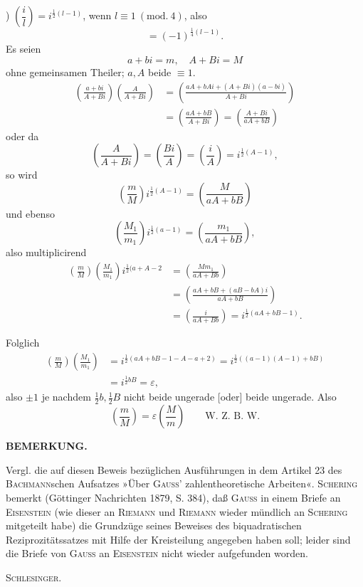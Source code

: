 \par{}) $\left(\dfrac il\right)=i^{\frac12(l-1)}$, wenn $l\equiv1\ (\mathrm{mod.}\ 4)$, also
\[
{}=(-1)^{\frac14(l-1)}.
\]
\noindent Es seien
\[
a+bi=m,\quad A+Bi=M
\]
\noindent ohne gemeinsamen Theiler; $a,A$ beide $\equiv1$.
\[
\begin{aligned}
\left(\frac{a+bi}{A+Bi}\right)\left(\frac A{A+Bi}\right)&=\left(\frac{aA+bAi+(A+Bi)(a-bi)}{A+Bi}\right)\\
&=\left(\frac{aA+bB}{A+Bi}\right)=\left(\frac{A+Bi}{aA+bB}\right)
\end{aligned}
\]
\noindent oder da
\[
\left(\frac A{A+Bi}\right)=\left(\frac{Bi}A\right)=\left(\frac iA\right)=i^{\frac12(A-1)},
\]
\noindent so wird
\[
\left(\frac mM\right)i^{\frac12(A-1)}=\left(\frac M{aA+bB}\right)
\]
\noindent und ebenso
\[
\left(\frac{M_1}{m_1}\right)i^{\frac12(a-1)}=\left(\frac{m_1}{aA+bB}\right),
\]
\noindent also multiplicirend
\[
\begin{aligned}
\left(\frac mM\right)\left(\frac{M_1}{m_1}\right)i^{\frac12(a+A-2}&=\left(\frac{Mm_1}{aA+Bb}\right)\\
&=\left(\frac{aA+bB+(aB-bA)i}{aA+bB}\right)\\
&=\left(\frac i{aA+Bb}\right)=i^{\frac12(aA+bB-1)}.
\end{aligned}
\]
\par\noindent\hspace*{\parindent}Folglich
\[
\begin{aligned}
\left(\frac mM\right)\left(\frac{M_1}{m_1}\right)&=i^{\frac12(aA+bB-1-A-a+2)}=i^{\frac12((a-1)(A-1)+bB)}\\
&=i^{\frac12bB}=\varepsilon,
\end{aligned}
\]
\noindent also $\pm1$ je nachdem $\tfrac12b,\tfrac12B$ nicht beide ungerade [oder] beide ungerade. Also
\[
\left(\frac mM\right)=\varepsilon\left(\frac Mm\right)\qquad\text{W. Z. B. W.}
\]
\begin{center}\textbf{BEMERKUNG.}\end{center}
\begingroup\small
\par\indent Vergl. die auf diesen Beweis bezüglichen Ausführungen in dem Artikel 23 des \textsc{Bachmann}schen Aufsatzes »Über \textsc{Gauss}' zahlentheoretische Arbeiten«. \textsc{Schering} bemerkt (Göttinger Nachrichten 1879, S. 384), daß \textsc{Gauss} in einem Briefe an \textsc{Eisenstein} (wie dieser an \textsc{Riemann} und \textsc{Riemann} wieder mündlich an \textsc{Schering} mitgeteilt habe) die Grundzüge seines Beweises des biquadratischen Reziprozitätssatzes mit Hilfe der Kreisteilung angegeben haben soll; leider sind die Briefe von \textsc{Gauss} an \textsc{Eisenstein} nicht wieder aufgefunden worden.
\begin{flushright}\textsc{Schlesinger.}\end{flushright}
\ClosingRule\clearpage\endgroup
